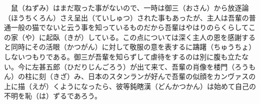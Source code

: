 　鼠（ねずみ）はまだ取った事がないので、一時は御三（おさん）から放逐論（ほうちくろん）さえ呈出（ていしゅつ）された事もあったが、主人は吾輩の普通一般の猫でないと云う事を知っているものだから吾輩はやはりのらくらしてこの家（や）に起臥（きが）している。この点については深く主人の恩を感謝すると同時にその活眼（かつがん）に対して敬服の意を表するに躊躇（ちゅうちょ）しないつもりである。御三が吾輩を知らずして虐待をするのは別に腹も立たない。今に左甚五郎（ひだりじんごろう）が出て来て、吾輩の肖像を楼門（ろうもん）の柱に刻（きざ）み、日本のスタンランが好んで吾輩の似顔をカンヴァスの上に描（えが）くようになったら、彼等鈍瞎漢（どんかつかん）は始めて自己の不明を恥（は）ずるであろう。\\
